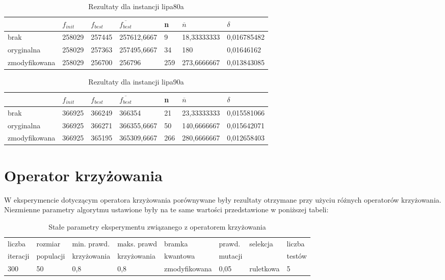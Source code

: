\begin{table}[H]
\label{T1_lipa80a}
\begin{tabular}{l l l l l l l}
\hline
 & $f_{init}$ & $f_{best}$ & $\overline{f_{best}}$ & n & $\overline{n}$ & $\delta$ \\
\hline
brak & 258029 & 257445 & 257612,6667 & 9 & 18,33333333 & 0,016785482\\
oryginalna & 258029 & 257363 & 257495,6667 & 34 & 180 & 0,01646162\\
zmodyfikowana & 258029 & 256700 & 256796 & 259 & 273,6666667 & 0,013843085\\
\hline
\end{tabular}
\caption{Rezultaty dla instancji lipa80a}
\end{table}

\begin{table}[H]
\label{T1_lipa90a}
\begin{tabular}{l l l l l l l}
\hline
 & $f_{init}$ & $f_{best}$ & $\overline{f_{best}}$ & n & $\overline{n}$ & $\delta$ \\
\hline
brak & 366925 & 366249 & 366354 & 21 & 23,33333333 & 0,015581066\\
oryginalna & 366925 & 366271 & 366355,6667 & 50 & 140,6666667 & 0,015642071\\
zmodyfikowana & 366925 & 365195 & 365309,6667 & 266 & 280,6666667 & 0,012658403\\
\hline
\end{tabular}
\caption{Rezultaty dla instancji lipa90a}
\end{table}

\section{Operator krzyżowania}
W eksperymencie dotyczącym operatora krzyżowania porównywane były rezultaty otrzymane przy użyciu różnych operatorów krzyżowania. Niezmienne parametry algorytmu ustawione były na te same wartości przedstawione w poniższej tabeli:

\begin{table}[H]
\label{T2_params}
\begin{tabular}{l l l l l l l l}
\hline
liczba & rozmiar & min. prawd. & maks. prawd & bramka & prawd. & selekcja & liczba \\
iteracji & populacji & krzyżowania & krzyżowania & kwantowa & mutacji & & testów \\
\hline
300 & 50 & 0,8 & 0,8 & zmodyfikowana & 0,05 & ruletkowa & 5 \\
\hline
\end{tabular}
\caption{Stałe parametry eksperymentu związanego z operatorem krzyżowania}
\end{table}

